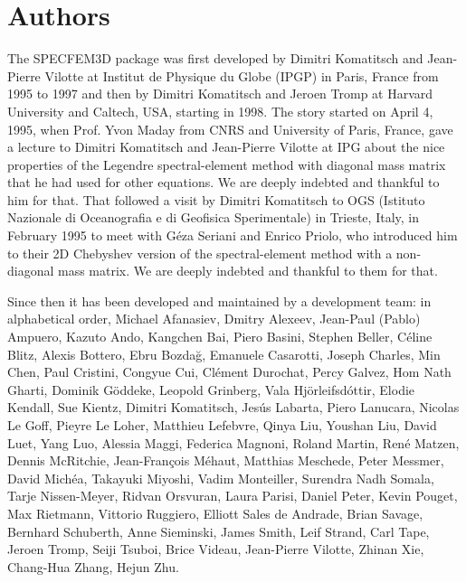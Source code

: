 \section*{Authors}

\noindent The SPECFEM3D package was first developed by Dimitri
Komatitsch and Jean-Pierre Vilotte at Institut de Physique du Globe
(IPGP) in Paris, France from 1995 to 1997 and then by Dimitri Komatitsch
and Jeroen Tromp at Harvard University and Caltech, USA, starting in 1998.
The story started on April 4, 1995, when Prof. Yvon Maday from CNRS and University of Paris, France, gave a lecture to
Dimitri Komatitsch and Jean-Pierre Vilotte at IPG about the nice properties of the Legendre spectral-element method with diagonal mass matrix that he had used for
other equations. We are deeply indebted and thankful to him for that.
That followed a visit by Dimitri Komatitsch to OGS (Istituto Nazionale di Oceanografia e di Geofisica Sperimentale) in Trieste, Italy, in February 1995
to meet with G\'eza Seriani and Enrico Priolo, who introduced him to their 2D Chebyshev version of the spectral-element method with a non-diagonal mass matrix.
We are deeply indebted and thankful to them for that.\newline

Since then it has been developed and maintained by a development team: in alphabetical order,
Michael Afanasiev,
Dmitry Alexeev,
Jean-Paul (Pablo) Ampuero,
Kazuto Ando,
Kangchen Bai,
Piero Basini,
Stephen Beller,
C\'eline Blitz,
Alexis Bottero,
Ebru Bozda\u{g},
Emanuele Casarotti,
Joseph Charles,
Min Chen,
Paul Cristini,
Congyue Cui,
Cl\'ement Durochat,
Percy Galvez,
Hom Nath Gharti,
Dominik G\"oddeke,
Leopold Grinberg,
Vala Hj\"orleifsd\'ottir,
Elodie Kendall,
Sue Kientz,
Dimitri Komatitsch,
Jes\'us Labarta,
Piero Lanucara,
Nicolas Le Goff,
Pieyre Le Loher,
Matthieu Lefebvre,
Qinya Liu,
Youshan Liu,
David Luet,
Yang Luo,
Alessia Maggi,
Federica Magnoni,
Roland Martin,
Ren\'e Matzen,
Dennis McRitchie,
Jean-Fran\c{c}ois M\'ehaut,
Matthias Meschede,
Peter Messmer,
David Mich\'ea,
Takayuki Miyoshi,
Vadim Monteiller,
Surendra Nadh Somala,
Tarje Nissen-Meyer,
Ridvan Orsvuran,
Laura Parisi,
Daniel Peter,
Kevin Pouget,
Max Rietmann,
Vittorio Ruggiero,
Elliott Sales de Andrade,
Brian Savage,
Bernhard Schuberth,
Anne Sieminski,
James Smith,
Leif Strand,
Carl Tape,
Jeroen Tromp,
Seiji Tsuboi,
Brice Videau,
Jean-Pierre Vilotte,
Zhinan Xie,
Chang-Hua Zhang,
Hejun Zhu.\newline


